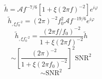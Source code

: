 \begin{equation}
    \tilde{h}=\mathcal{A}f^{-7/6}[1+\xi(2\pi f)^{-2}]e^{i\varphi}
\end{equation}
\begin{equation}
    \tilde{h}_{,\xi f_0^{-2}}=(2\pi)^{-2}f_0^{2}\mathcal{A}f^{-19/6}e^{i\varphi}
\end{equation}
\begin{equation}
    \tilde{h}_{,\xi f_0^{-2}}=\frac{(2\pi f/f_0)^{-2}}{1+\xi(2\pi f)^{-2}}\tilde{h}
\end{equation}
\begin{equation}
    \sim\left[\frac{(2\pi)^{-2}}{1+\xi(2\pi f_0)^{-2}}\right]^2\text{SNR}^2
\end{equation}
\begin{equation}
    \sim\text{SNR}^2
\end{equation}
